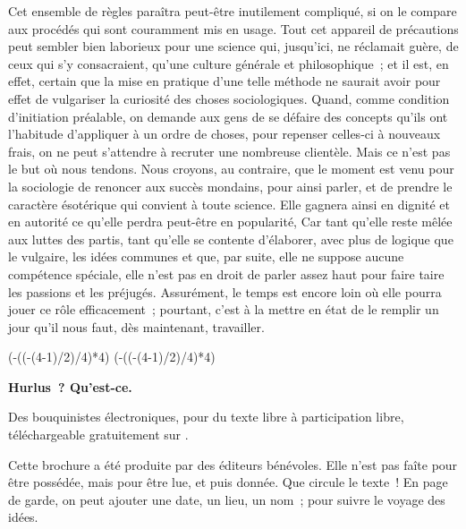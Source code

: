 \documentclass[french,twoside]{book} %
\newcommand\chapterclose{} %
\def\truncdiv#1#2{((#1-(#2-1)/2)/#2)}
\def\moduloop#1#2{(#1-\truncdiv{#1}{#2}*#2)}
\def\modulo#1#2{\number\numexpr\moduloop{#1}{#2}\relax}
\begin{document}
Cet ensemble de règles paraîtra peut-être inutilement compliqué, si on le compare aux procédés qui sont couramment mis en usage. Tout cet appareil de précautions peut sembler bien laborieux pour une science qui, jusqu’ici, ne réclamait guère, de ceux qui s’y consacraient, qu’une culture générale et philosophique ; et il est, en effet, certain que la mise en pratique d’une telle méthode ne saurait avoir pour effet de vulgariser la curiosité des choses sociologiques. Quand, comme condition d’initiation préalable, on demande aux gens de se défaire des concepts qu’ils ont l’habitude d’appliquer à un ordre de choses, pour repenser celles-ci à nouveaux frais, on ne peut s’attendre à recruter une nombreuse clientèle. Mais ce n’est pas le but où nous tendons. Nous croyons, au contraire, que le moment est venu pour la sociologie de renoncer aux succès mondains, pour ainsi parler, et de prendre le caractère ésotérique qui convient à toute science. Elle gagnera ainsi en dignité et en autorité ce qu’elle perdra peut-être en popularité, Car tant qu’elle reste mêlée aux luttes des partis, tant qu’elle se contente d’élaborer, avec plus de logique que le vulgaire, les idées communes et que, par suite, elle ne suppose aucune compétence spéciale, elle n’est pas en droit de parler assez haut pour faire taire les passions et les préjugés. Assurément, le temps est encore loin où elle pourra jouer ce rôle efficacement ; pourtant, c’est à la mettre en état de le remplir un jour qu’il nous faut, dès maintenant, travailler.
\chapterclose

 


\ifbooklet
  \pagestyle{empty}
  \clearpage
  \ifnum\modulo{\value{page}}{4}=0 \hbox{}\newpage\hbox{}\newpage\fi
  \ifnum\modulo{\value{page}}{4}=1 \hbox{}\newpage\hbox{}\newpage\fi


  \hbox{}\newpage
  \ifodd\value{page}\hbox{}\newpage\fi
  {\centering\color{rubric}\bfseries\noindent\large
    Hurlus ? Qu’est-ce.\par
    \bigskip
  }
  \noindent Des bouquinistes électroniques, pour du texte libre à participation libre,
  téléchargeable gratuitement sur \href{https://hurlus.fr}{}.\par
  \bigskip
  \noindent Cette brochure a été produite par des éditeurs bénévoles.
  Elle n’est pas faîte pour être possédée, mais pour être lue, et puis donnée.
  Que circule le texte !
  En page de garde, on peut ajouter une date, un lieu, un nom ; pour suivre le voyage des idées.
  \par
\end{document}
